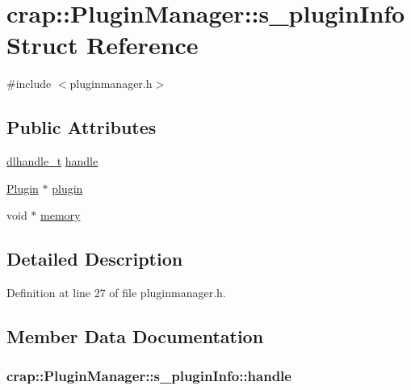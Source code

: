 \hypertarget{structcrap_1_1_plugin_manager_1_1s__plugin_info}{}\section{crap\+:\+:Plugin\+Manager\+:\+:s\+\_\+plugin\+Info Struct Reference}
\label{structcrap_1_1_plugin_manager_1_1s__plugin_info}


{\ttfamily \#include $<$pluginmanager.\+h$>$}

\subsection*{Public Attributes}
\begin{DoxyCompactItemize}
\item 
\hyperlink{namespacecrap_acee8e66495f007816233ce6b2da6465b}{dlhandle\+\_\+t} \hyperlink{structcrap_1_1_plugin_manager_1_1s__plugin_info_a1c38a5ca872244e1d5332bf94d5532dd}{handle}
\item 
\hyperlink{classcrap_1_1_plugin}{Plugin} $\ast$ \hyperlink{structcrap_1_1_plugin_manager_1_1s__plugin_info_a51bdb002b066f8a4d440f783fd3c67f3}{plugin}
\item 
void $\ast$ \hyperlink{structcrap_1_1_plugin_manager_1_1s__plugin_info_aa9e91a882db31c6be7ac1a2ffbf891a4}{memory}
\end{DoxyCompactItemize}


\subsection{Detailed Description}


Definition at line 27 of file pluginmanager.\+h.



\subsection{Member Data Documentation}
\hypertarget{structcrap_1_1_plugin_manager_1_1s__plugin_info_a1c38a5ca872244e1d5332bf94d5532dd}{}
\subsubsection[{handle}]{ crap\+::\+Plugin\+Manager\+::s\+\_\+plugin\+Info\+::handle}\label{structcrap_1_1_plugin_manager_1_1s__plugin_info_a1c38a5ca872244e1d5332bf94d5532dd}


